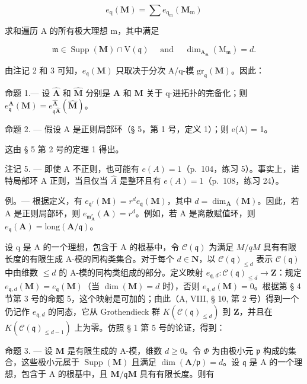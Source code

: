 \[
e _ {\mathrm{q}} (\mathbf {M}) = \sum e _ {\mathrm{q} _ {\mathrm{m}}} (\mathbf {M} _ {\mathrm{m}})
\]

求和遍历 A 的所有极大理想 m，其中满足

\[
\mathfrak {m} \in \operatorname{Supp} (\mathbf {M}) \cap \mathrm{V} (\mathfrak {q}) \quad \text { and } \quad \dim_ {\mathrm{A} _ {\mathfrak {m}}} (\mathrm{M} _ {\mathfrak {m}}) = d  .
\]

由注记 2 和 3 可知，\(e_{\mathfrak{q}}(\mathbf{M})\) 只取决于分次 A/q-模 \(\mathrm{gr}_{\mathfrak{q}}(\mathbf{M})\)。因此：

命题 1.--- 设 \(\hat{\mathbf{A}}\) 和 \(\hat{\mathbf{M}}\) 分别是 \(\mathbf{A}\) 和 \(\mathbf{M}\) 关于 q-进拓扑的完备化；则 \(e_{\mathfrak{q}}^{\mathbf{A}}(\mathbf{M}) = e_{\mathfrak{q}\hat{\mathbf{A}}}^{\hat{\mathbf{A}}}(\hat{\mathbf{M}})\)。

命题 2. --- 假设 A 是正则局部环（§ 5，第 1 号，定义 1）；则 e(A) = 1。

这由 § 5 第 2 号的定理 1 得出。

注记 5. --- 即使 A 不正则，也可能有 \(e(A) = 1\)（p.~104，练习 5）。事实上，诺特局部环 A 正则，当且仅当 \(\hat{A}\) 是整环且有 \(e(A) = 1\)（p.~108，练习 24）。

例。--- 根据定义，有 \(e_{\mathfrak{q}^{r}}(\mathbf{M}) = r^{d}e_{\mathfrak{q}}(\mathbf{M})\)，其中 \(d = \dim_{\mathbf{A}}(\mathbf{M})\)。因此，若 A 是正则局部环，则 \(e_{\mathfrak{m}_{\mathbf{A}}^{r}}(\mathbf{A}) = r^{d}\)。例如，若 A 是离散赋值环，则 \(e_{\mathfrak{q}}(\mathbf{A}) = \text{long}(\mathbf{A}/\mathfrak{q})\)。

设 q 是 A 的一个理想，包含于 A 的根基中，令 \(\mathcal{C}(\mathfrak{q})\) 为满足 \(M/qM\) 具有有限长度的有限生成 A-模的同构类集合。对于每个 \(d \in \mathbf{N}\)，以 \(\mathcal{C}(\mathfrak{q})_{\leq d}\) 表示 \(\mathcal{C}(\mathfrak{q})\) 中由维数 \(\leqslant d\) 的 A-模的同构类组成的部分。定义映射 \(e_{\mathfrak{q},d}: \mathcal{C}(\mathfrak{q})_{\leq d} \to \mathbf{Z}\)：规定 \(e_{\mathfrak{q},d}(\mathbf{M}) = e_{\mathfrak{q}}(\mathbf{M})\)（当 \(\dim(\mathbf{M}) = d\) 时），否则 \(e_{\mathfrak{q},d}(\mathbf{M}) = 0\)。根据第 § 4 节第 3 号的命题 5，这个映射是可加的；由此（A, VIII, § 10, 第 2 号）得到一个仍记作 \(e_{\mathfrak{q},d}\) 的同态，它从 Grothendieck 群 \(K(\mathcal{C}(\mathfrak{q})_{\leq d})\) 到 \(\mathbf{Z}\)，并且在 \(K(\mathcal{C}(\mathfrak{q})_{\leq d-1})\) 上为零。仿照 § 1 第 5 号的论证，得到：

命题 3. — 设 \(\mathbf{M}\) 是有限生成的 A-模，维数 \(d \geqslant 0\)。令 \(\Phi\) 为由极小元 \(\mathfrak{p}\) 构成的集合，这些极小元属于 \(\operatorname{Supp}(\mathbf{M})\) 且满足 \(\dim(\mathbf{A}/\mathfrak{p}) = d\)。设 \(\mathfrak{q}\) 是 A 的一个理想，包含于 A 的根基中，且 \(\mathbf{M}/\mathfrak{q}\mathbf{M}\) 具有有限长度。则有

